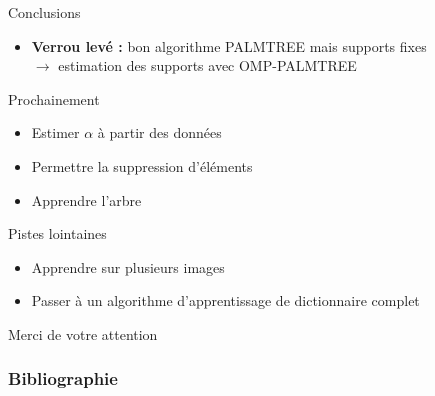 \begin{frame}{Conclusions}

\begin{itemize}
\item[\cmark] \textbf{Verrou levé :} bon algorithme PALMTREE mais supports \alert{fixes} \\
	$\rightarrow$ \alert{estimation} des supports avec OMP-PALMTREE

\end{itemize}
Prochainement
\begin{itemize}
\item Estimer $\alpha$ à partir des données
\item Permettre la suppression d'éléments
\item Apprendre l'arbre

\end{itemize}
Pistes lointaines
\begin{itemize}
\item[\textcolor{purple}{\ding{43}}] Apprendre sur plusieurs images
\item[\textcolor{purple}{\ding{43}}] Passer à un algorithme d'apprentissage de dictionnaire complet
\end{itemize}
\vfill
\hfill Merci de votre attention
\end{frame}

\appendix

\begin{frame}
\frametitle{Bibliographie}
\printbibliography[heading=none]
\end{frame}


